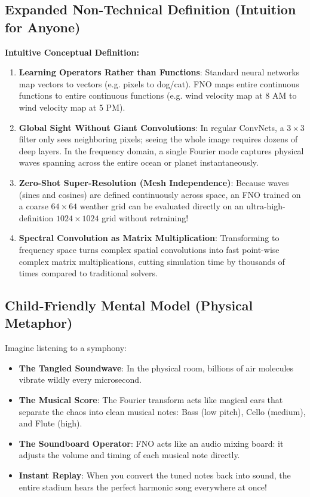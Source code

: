 \documentclass[11pt,a4paper]{article}
\theoremstyle{definition}
\begin{document}
\subsection{Expanded Non-Technical Definition (Intuition for Anyone)}
\textbf{Intuitive Conceptual Definition:}
\begin{enumerate}
    \item \textbf{Learning Operators Rather than Functions}: Standard neural networks map vectors to vectors (e.g. pixels to dog/cat). FNO maps entire continuous functions to entire continuous functions (e.g. wind velocity map at 8 AM to wind velocity map at 5 PM).
    \item \textbf{Global Sight Without Giant Convolutions}: In regular ConvNets, a $3 \times 3$ filter only sees neighboring pixels; seeing the whole image requires dozens of deep layers. In the frequency domain, a single Fourier mode captures physical waves spanning across the entire ocean or planet instantaneously.
    \item \textbf{Zero-Shot Super-Resolution (Mesh Independence)}: Because waves (sines and cosines) are defined continuously across space, an FNO trained on a coarse $64 \times 64$ weather grid can be evaluated directly on an ultra-high-definition $1024 \times 1024$ grid without retraining!
    \item \textbf{Spectral Convolution as Matrix Multiplication}: Transforming to frequency space turns complex spatial convolutions into fast point-wise complex matrix multiplications, cutting simulation time by thousands of times compared to traditional solvers.
\end{enumerate}

\subsection{Child-Friendly Mental Model (Physical Metaphor)}
Imagine listening to a symphony:
\begin{itemize}
    \item \textbf{The Tangled Soundwave}: In the physical room, billions of air molecules vibrate wildly every microsecond.
    \item \textbf{The Musical Score}: The Fourier transform acts like magical ears that separate the chaos into clean musical notes: Bass (low pitch), Cello (medium), and Flute (high).
    \item \textbf{The Soundboard Operator}: FNO acts like an audio mixing board: it adjusts the volume and timing of each musical note directly.
    \item \textbf{Instant Replay}: When you convert the tuned notes back into sound, the entire stadium hears the perfect harmonic song everywhere at once!
\end{itemize}
\end{document}
